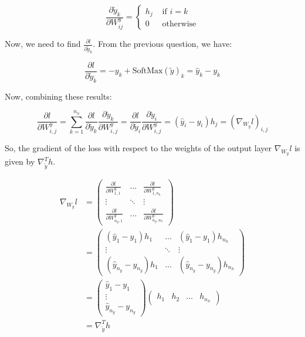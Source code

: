 \documentclass{article}
\theoremstyle{plain}%
\theoremstyle{definition}
\theoremstyle{remark}
\begin{document}
\[
    \frac{\partial \tilde{y}_k }{\partial W^y_{ij}} = \begin{cases}
        h_j & \text{ if } i=k   \\
        0   & \text{ otherwise}
    \end{cases}
\]

Now, we need to find \( \frac{\partial l}{\partial \tilde{y}_k} \). From the previous question, we have:

\[
    \frac{\partial l}{\partial \tilde{y}_k} = -y_k + \text{SoftMax}(\tilde{y})_k = \hat{y}_k - y_k
\]

Now, combining these results:

\[
    \frac{\partial l}{\partial W_{i,j}^y} = \sum_{k=1}^{n_h} \frac{\partial l}{\partial \tilde{y}_k} \frac{\partial \tilde{y}_k}{\partial W_{i,j}^y} =  \frac{\partial l}{\partial \tilde{y}_i} \frac{\partial \tilde{y}_i}{\partial W_{i,j}^y} = (\hat{y}_i - y_i) h_j = (\nabla _{W_y} l)_{i,j}
\]

So, the gradient of the loss with respect to the weights of the output layer \( \nabla_{W_y} l \) is given by \( \nabla _{\tilde{y}} ^T h \).

\begin{align*}
    \nabla_{W_y} l & = \begin{pmatrix}
                           \frac{\partial l}{\partial W^y_{1,1}}   & \dots  & \frac{\partial l}{\partial W^y_{1,n_h}}    \\
                           \vdots                                  & \ddots & \vdots                                     \\
                           \frac{\partial l}{\partial W^y_{n_y,1}} & \dots  & \frac{\partial l}{\partial W^y_{n_y, n_h}}
                       \end{pmatrix} \\
                   & = \begin{pmatrix}
                           (\hat{y}_1 - y_1) h_{1}         & \dots  & (\hat{y}_1 - y_1) h_{n_h}         \\
                           \vdots                          & \ddots & \vdots                            \\
                           (\hat{y}_{n_y} - y_{n_y}) h_{1} & \dots  & (\hat{y}_{n_y} - y_{n_y}) h_{n_h}
                       \end{pmatrix}                  \\
                   & = \begin{pmatrix}
                           \hat{y}_1 - y_1 \\
                           \vdots          \\
                           \hat{y}_{n_y} - y_{n_y}
                       \end{pmatrix} \begin{pmatrix}
                                         h_1 & h_2 & \dots & h_{n_h}
                                     \end{pmatrix}                                                     \\
                   & = \nabla _{\tilde{y}} ^T h
\end{align*}
\end{document}
